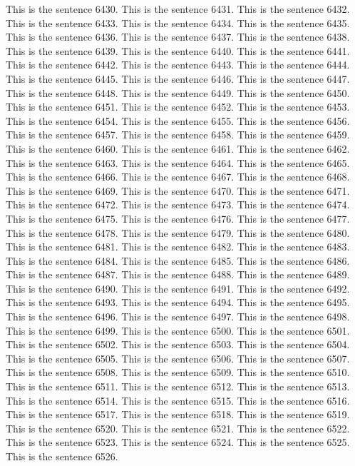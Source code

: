 \documentclass{article}
\begin{document}
This is the sentence 6430.
This is the sentence 6431.
This is the sentence 6432.
This is the sentence 6433.
This is the sentence 6434.
This is the sentence 6435.
This is the sentence 6436.
This is the sentence 6437.
This is the sentence 6438.
This is the sentence 6439.
This is the sentence 6440.
This is the sentence 6441.
This is the sentence 6442.
This is the sentence 6443.
This is the sentence 6444.
This is the sentence 6445.
This is the sentence 6446.
This is the sentence 6447.
This is the sentence 6448.
This is the sentence 6449.
This is the sentence 6450.
This is the sentence 6451.
This is the sentence 6452.
This is the sentence 6453.
This is the sentence 6454.
This is the sentence 6455.
This is the sentence 6456.
This is the sentence 6457.
This is the sentence 6458.
This is the sentence 6459.
This is the sentence 6460.
This is the sentence 6461.
This is the sentence 6462.
This is the sentence 6463.
This is the sentence 6464.
This is the sentence 6465.
This is the sentence 6466.
This is the sentence 6467.
This is the sentence 6468.
This is the sentence 6469.
This is the sentence 6470.
This is the sentence 6471.
This is the sentence 6472.
This is the sentence 6473.
This is the sentence 6474.
This is the sentence 6475.
This is the sentence 6476.
This is the sentence 6477.
This is the sentence 6478.
This is the sentence 6479.
This is the sentence 6480.
This is the sentence 6481.
This is the sentence 6482.
This is the sentence 6483.
This is the sentence 6484.
This is the sentence 6485.
This is the sentence 6486.
This is the sentence 6487.
This is the sentence 6488.
This is the sentence 6489.
This is the sentence 6490.
This is the sentence 6491.
This is the sentence 6492.
This is the sentence 6493.
This is the sentence 6494.
This is the sentence 6495.
This is the sentence 6496.
This is the sentence 6497.
This is the sentence 6498.
This is the sentence 6499.
This is the sentence 6500.
This is the sentence 6501.
This is the sentence 6502.
This is the sentence 6503.
This is the sentence 6504.
This is the sentence 6505.
This is the sentence 6506.
This is the sentence 6507.
This is the sentence 6508.
This is the sentence 6509.
This is the sentence 6510.
This is the sentence 6511.
This is the sentence 6512.
This is the sentence 6513.
This is the sentence 6514.
This is the sentence 6515.
This is the sentence 6516.
This is the sentence 6517.
This is the sentence 6518.
This is the sentence 6519.
This is the sentence 6520.
This is the sentence 6521.
This is the sentence 6522.
This is the sentence 6523.
This is the sentence 6524.
This is the sentence 6525.
This is the sentence 6526.
\end{document}
